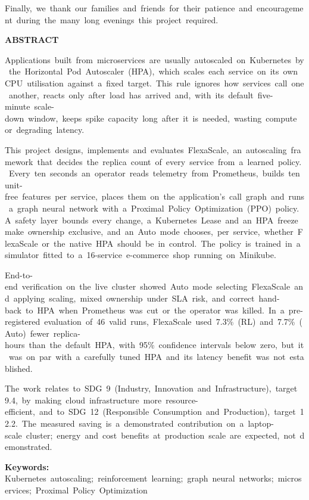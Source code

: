 \documentclass[12pt,a4paper,oneside]{report}
\begin{document}
Finally,~we~thank~our~families~and~friends~for~their~patience~and~encouragement~during~the~many~long~evenings~this~project~required.

\clearpage
{}
{}
{\centering \Large\bfseries ABSTRACT\par}
Applications~built~from~microservices~are~usually~autoscaled~on~Kubernetes~by~the~Horizontal~Pod~Autoscaler~(HPA),~which~scales~each~service~on~its~own~CPU~utilisation~against~a~fixed~target.~This~rule~ignores~how~services~call~one~another,~reacts~only~after~load~has~arrived~and,~with~its~default~five-minute~scale-down~window,~keeps~spike~capacity~long~after~it~is~needed,~wasting~compute~or~degrading~latency.

This~project~designs,~implements~and~evaluates~FlexaScale,~an~autoscaling~framework~that~decides~the~replica~count~of~every~service~from~a~learned~policy.~Every~ten~seconds~an~operator~reads~telemetry~from~Prometheus,~builds~ten~unit-free~features~per~service,~places~them~on~the~application's~call~graph~and~runs~a~graph~neural~network~with~a~Proximal~Policy~Optimization~(PPO)~policy.~A~safety~layer~bounds~every~change,~a~Kubernetes~Lease~and~an~HPA~freeze~make~ownership~exclusive,~and~an~Auto~mode~chooses,~per~service,~whether~FlexaScale~or~the~native~HPA~should~be~in~control.~The~policy~is~trained~in~a~simulator~fitted~to~a~16-service~e-commerce~shop~running~on~Minikube.

End-to-end~verification~on~the~live~cluster~showed~Auto~mode~selecting~FlexaScale~and~applying~scaling,~mixed~ownership~under~SLA~risk,~and~correct~hand-back~to~HPA~when~Prometheus~was~cut~or~the~operator~was~killed.~In~a~pre-registered~evaluation~of~46~valid~runs,~FlexaScale~used~7.3\%~(RL)~and~7.7\%~(Auto)~fewer~replica-hours~than~the~default~HPA,~with~95\%~confidence~intervals~below~zero,~but~it~was~on~par~with~a~carefully~tuned~HPA~and~its~latency~benefit~was~not~established.

The~work~relates~to~SDG~9~(Industry,~Innovation~and~Infrastructure),~target~9.4,~by~making~cloud~infrastructure~more~resource-efficient,~and~to~SDG~12~(Responsible~Consumption~and~Production),~target~12.2.~The~measured~saving~is~a~demonstrated~contribution~on~a~laptop-scale~cluster;~energy~and~cost~benefits~at~production~scale~are~expected,~not~demonstrated.

\textbf{Keywords:} Kubernetes~autoscaling;~reinforcement~learning;~graph~neural~networks;~microservices;~Proximal~Policy~Optimization
\end{document}
